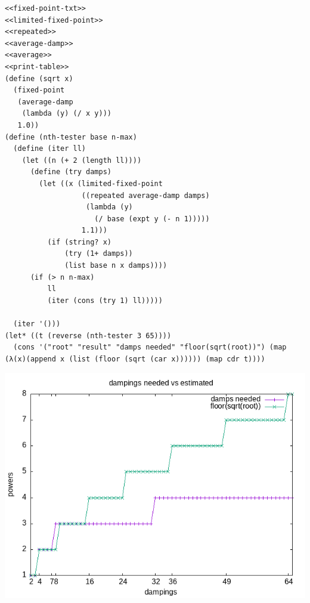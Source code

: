 \documentclass[final,fleqn,titlepage]{article}
\begin{document}
\begin{verbatim}
<<fixed-point-txt>>
<<limited-fixed-point>>
<<repeated>>
<<average-damp>>
<<average>>
<<print-table>>
(define (sqrt x)
  (fixed-point
   (average-damp
    (lambda (y) (/ x y)))
   1.0))
(define (nth-tester base n-max)
  (define (iter ll)
    (let ((n (+ 2 (length ll))))
      (define (try damps)
        (let ((x (limited-fixed-point
                  ((repeated average-damp damps)
                   (lambda (y)
                     (/ base (expt y (- n 1)))))
                  1.1)))
          (if (string? x)
              (try (1+ damps))
              (list base n x damps))))
      (if (> n n-max)
          ll
          (iter (cons (try 1) ll)))))

  (iter '()))
(let* ((t (reverse (nth-tester 3 65))))
  (cons '("root" "result" "damps needed" "floor(sqrt(root))") (map (λ(x)(append x (list (floor (sqrt (car x)))))) (map cdr t))))
\end{verbatim}

\begin{center}
\includegraphics[width=.9\linewidth]{fig/1-45-1.png}
\end{center}
\end{document}
